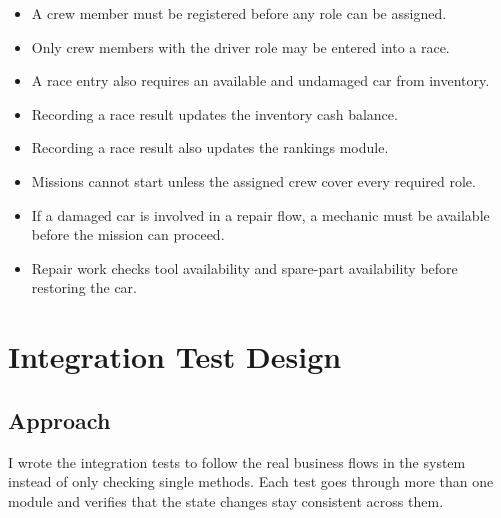\documentclass[12pt]{article}
\begin{document}
\begin{itemize}
  \item A crew member must be registered before any role can be assigned.
  \item Only crew members with the driver role may be entered into a race.
  \item A race entry also requires an available and undamaged car from inventory.
  \item Recording a race result updates the inventory cash balance.
  \item Recording a race result also updates the rankings module.
  \item Missions cannot start unless the assigned crew cover every required role.
  \item If a damaged car is involved in a repair flow, a mechanic must be available before the mission can proceed.
  \item Repair work checks tool availability and spare-part availability before restoring the car.
\end{itemize}

\section{Integration Test Design}
\subsection{Approach}
I wrote the integration tests to follow the real business flows in the system instead of only checking single methods. Each test goes through more than one module and verifies that the state changes stay consistent across them.
\end{document}
